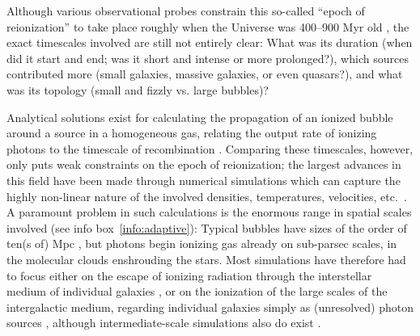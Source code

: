 \documentclass[useAMS]{aa}
\begin{document}
Although various observational probes constrain this so-called ``epoch of reionization'' to take place roughly when the Universe was 400--900 Myr old \citep[e.g.][]{Mason2019}, the exact timescales involved are still not entirely clear:
What was its duration (when did it start and end; was it short and intense or more prolonged?), which sources contributed more (small galaxies, massive galaxies, or even quasars?),
and what was its topology (small and fizzly vs. large bubbles)?

Analytical solutions exist for calculating the propagation of an ionized bubble around a source in a homogeneous gas, relating the output rate of ionizing photons to the timescale of recombination \citep{Stromgren1939,Dopita2003}.
Comparing these timescales, however, only puts weak constraints on the epoch of reionization; the largest advances in this field have been made through numerical simulations which can capture the highly non-linear nature of the involved densities, temperatures, velocities, etc.~\citep[see e.g.][for recent advances regarding the topology of reionization]{Hutter2020,Perez2022}.
A paramount problem in such calculations is the enormous range in spatial scales involved (see info box~\ref{info:adaptive}):
Typical bubbles have sizes of the order of ten(s of) Mpc \citep{Wyithe2004,Giri2018}, but photons begin ionizing gas already on sub-parsec scales, in the molecular clouds enshrouding the stars.
Most simulations have therefore had to focus either on the escape of ionizing radiation through the interstellar medium of individual galaxies \citep[e.g.][]{Haid2019}, or on the ionization of the large scales of the intergalactic medium, regarding individual galaxies simply as (unresolved) photon sources \citep[e.g.][]{Jensen2013,Jensen2014}, although intermediate-scale simulations also do exist \citep[e.g.][]{Rosdahl2022}.
\end{document}

